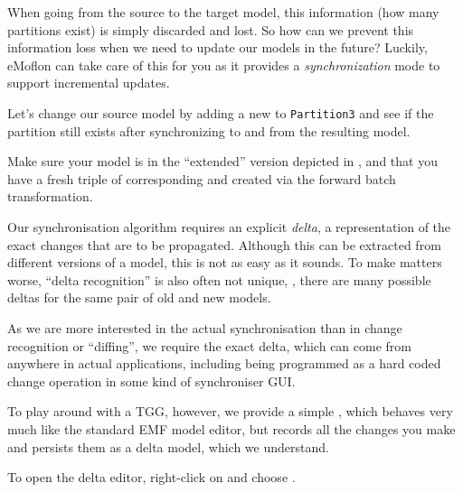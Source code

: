 When going from the source to the target model, this information (how many partitions exist) is simply discarded and lost. 
So how can we prevent this information loss when we need to update our models in the future? Luckily, eMoflon can take care of this for you as it provides a \emph{synchronization} mode to support incremental updates.

Let's change our source model by adding a new  to \texttt{Partition3} and see if the partition still exists after synchronizing to and from the resulting  model.

\begin{stepbystep}
\item Make sure your  model is in the \enquote{extended} version depicted in , and that you have a fresh triple of corresponding  and  created via the forward batch transformation.

\item Our synchronisation algorithm requires an explicit \emph{delta}, a representation of the exact changes that are to be propagated.
Although this can be extracted from different versions of a model, this is not as easy as it sounds.
To make matters worse, \enquote{delta recognition} is also often not unique, \idest, there are many possible deltas for the same pair of old and new models.

As we are more interested in the actual synchronisation than in change recognition or \enquote{diffing}, we require the exact delta, which can come from anywhere in actual applications, including being programmed as a hard coded change operation in some kind of synchroniser GUI.

To play around with a TGG, however, we provide a simple , which behaves very much like the standard EMF model editor, but records all the changes you make and persists them as a delta model, which we understand.

To open the delta editor, right-click on  and choose .


\end{stepbystep}
